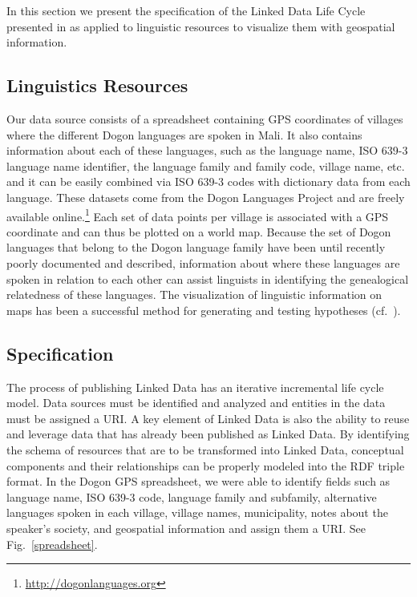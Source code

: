 In this section we present the specification of the Linked Data Life Cycle presented in \cite{Villazon_2011} as applied to linguistic resources to visualize them with geospatial information.

\subsection{Linguistics Resources}\label{sec:lr}

Our data source consists of a spreadsheet containing GPS coordinates of villages where the different Dogon languages are spoken in Mali. It also contains information about each of these languages, such as the language name, ISO 639-3 language name identifier, the language family and family code, village name, etc. and it can be easily combined via ISO 639-3 codes with dictionary data from each language. These datasets come from the Dogon Languages Project and are freely available online.\footnote{\url{http://dogonlanguages.org}} Each set of data points per village is associated with a GPS coordinate and can thus be plotted on a world map. Because the set of Dogon languages that belong to the Dogon language family have been until recently poorly documented and described, information about where these languages are spoken in relation to each other can assist linguists in identifying the genealogical relatedness of these languages. The visualization of linguistic information on maps has been a successful method for generating and testing hypotheses (cf.\ \cite{Haspelmath_etal2008}).


\subsection{Specification}
The process of publishing Linked Data has an iterative incremental life cycle model. Data sources must be identified and analyzed and entities in the data must be assigned a URI. A key element of Linked Data is also the ability to reuse and leverage data that has already been published as Linked Data. By identifying the schema of resources that are to be transformed into Linked Data, conceptual components and their relationships can be properly modeled into the RDF triple format. In the Dogon GPS spreadsheet, we were able to identify fields such as language name, ISO 639-3 code, language family and subfamily, alternative languages spoken in each village, village names, municipality, notes about the speaker's society, and geospatial information and assign them a URI. See Fig.\ \ref{spreadsheet}.

